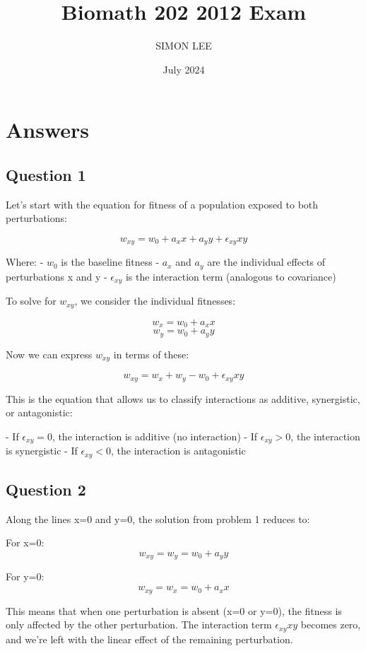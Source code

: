 \documentclass{article}
\title{Biomath 202 2012 Exam}
\author{SIMON LEE}
\date{July 2024}
\begin{document}
\maketitle

\section{Answers}

\subsection{Question 1}

Let's start with the equation for fitness of a population exposed to both perturbations:

\[w_{xy} = w_0 + a_x x + a_y y + \epsilon_{xy} xy\]

Where:
- $w_0$ is the baseline fitness
- $a_x$ and $a_y$ are the individual effects of perturbations x and y
- $\epsilon_{xy}$ is the interaction term (analogous to covariance)

To solve for $w_{xy}$, we consider the individual fitnesses:

\[w_x = w_0 + a_x x\]
\[w_y = w_0 + a_y y\]

Now we can express $w_{xy}$ in terms of these:

\[w_{xy} = w_x + w_y - w_0 + \epsilon_{xy} xy\]

This is the equation that allows us to classify interactions as additive, synergistic, or antagonistic:

- If $\epsilon_{xy} = 0$, the interaction is additive (no interaction)
- If $\epsilon_{xy} > 0$, the interaction is synergistic
- If $\epsilon_{xy} < 0$, the interaction is antagonistic

\subsection{Question 2}

Along the lines x=0 and y=0, the solution from problem 1 reduces to:

For x=0: 
\[w_{xy} = w_y = w_0 + a_y y\]

For y=0: 
\[w_{xy} = w_x = w_0 + a_x x\]

This means that when one perturbation is absent (x=0 or y=0), the fitness is only affected by the other perturbation. The interaction term $\epsilon_{xy} xy$ becomes zero, and we're left with the linear effect of the remaining perturbation.
\end{document}

